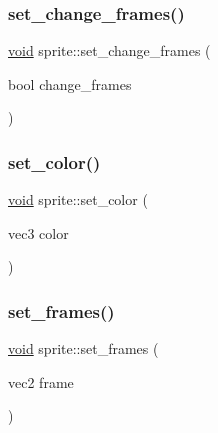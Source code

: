 \mbox{\label{classsprite_ab682d38f77706a999f53a1e62bf2539e}} 
\subsubsection{\texorpdfstring{set\+\_\+change\+\_\+frames()}{set\_change\_frames()}}
{\footnotesize\ttfamily \hyperlink{imgui__impl__opengl3__loader_8h_ac668e7cffd9e2e9cfee428b9b2f34fa7}{void} sprite\+::set\+\_\+change\+\_\+frames (\begin{DoxyParamCaption}\item[{bool}]{change\+\_\+frames }\end{DoxyParamCaption})\hspace{0.3cm}{\ttfamily [inline]}}

\mbox{\label{classsprite_a43c820290835b2ba00b789af65ad6dca}} 
\subsubsection{\texorpdfstring{set\+\_\+color()}{set\_color()}}
{\footnotesize\ttfamily \hyperlink{imgui__impl__opengl3__loader_8h_ac668e7cffd9e2e9cfee428b9b2f34fa7}{void} sprite\+::set\+\_\+color (\begin{DoxyParamCaption}\item[{vec3}]{color }\end{DoxyParamCaption})\hspace{0.3cm}{\ttfamily [inline]}}

\mbox{\label{classsprite_a2ee0454b622030ee1f4a7d8d130db410}} 
\subsubsection{\texorpdfstring{set\+\_\+frames()}{set\_frames()}}
{\footnotesize\ttfamily \hyperlink{imgui__impl__opengl3__loader_8h_ac668e7cffd9e2e9cfee428b9b2f34fa7}{void} sprite\+::set\+\_\+frames (\begin{DoxyParamCaption}\item[{vec2}]{frame }\end{DoxyParamCaption})\hspace{0.3cm}{\ttfamily [inline]}}

